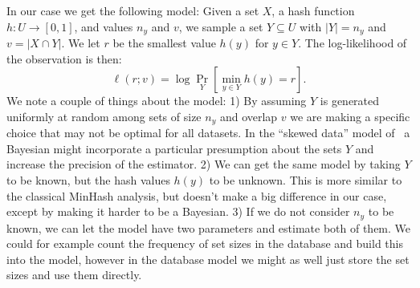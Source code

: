 In our case we get the following model:
Given a set $X$, a hash function $h:U\to [0,1]$, and values $n_y$ and $v$, we sample a set $Y\subseteq U$ with $|Y|=n_y$ and $v=|X\cap Y|$.
We let $r$ be the smallest value $h(y)$ for $y\in Y$.
The log-likelihood of the observation is then:
\[
   \ell(r; v) = \log\Pr_{Y}[\min_{y\in Y}h(y) = r].
\]
We note a couple of things about the model:
1) By assuming $Y$ is generated uniformly at random among sets of size $n_y$ and overlap $v$ we are making a specific choice that may not be optimal for all datasets.
In the ``skewed data'' model of~\cite{mccauley2018set} a Bayesian might incorporate a particular presumption about the sets $Y$ and increase the precision of the estimator.
2) We can get the same model by taking $Y$ to be known, but the hash values $h(y)$ to be unknown.
This is more similar to the classical MinHash analysis, but doesn't make a big difference in our case, except by making it harder to be a Bayesian.
3) If we do not consider $n_y$ to be known, we can let the model have two parameters and estimate both of them.
We could for example count the frequency of set sizes in the database and build this into the model, however in the database model we might as well just store the set sizes and use them directly.

